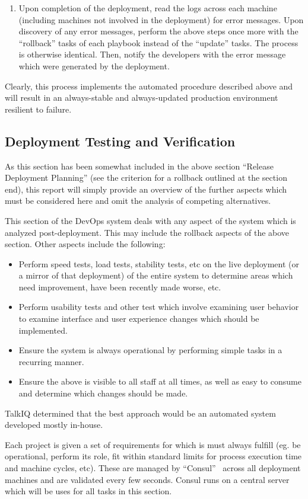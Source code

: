 \documentclass[12pt]{article}
\begin{document}
\begin{enumerate}
\item Upon completion of the deployment, read the logs across each machine (including machines not involved in the deployment) for error messages. Upon discovery of any error messages, perform the above steps once more with the ``rollback'' tasks of each playbook instead of the ``update'' tasks. The process is otherwise identical. Then, notify the developers with the error message which were generated by the deployment.
\end{enumerate}

Clearly, this process implements the automated procedure described above and will result in an always-stable and always-updated production environment resilient to failure.

\subsection{Deployment Testing and Verification}
As this section has been somewhat included in the above section ``Release Deployment Planning'' (see the criterion for a rollback outlined at the section end), this report will simply provide an overview of the further aspects which must be considered here and omit the analysis of competing alternatives.

This section of the DevOps system deals with any aspect of the system which is analyzed post-deployment. This may include the rollback aspects of the above section. Other aspects include the following:
\begin{itemize}
\item Perform speed tests, load tests, stability tests, etc on the live deployment (or a mirror of that deployment) of the entire system to determine areas which need improvement, have been recently made worse, etc.
\item Perform usability tests and other test which involve examining user behavior to examine interface and user experience changes which should be implemented.
\item Ensure the system is always operational by performing simple tasks in a recurring manner.
\item Ensure the above is visible to all staff at all times, as well as easy to consume and determine which changes should be made.
\end{itemize}

TalkIQ determined that the best approach would be an automated system developed mostly in-house.

Each project is given a set of requirements for which is must always fulfill (eg. be operational, perform its role, fit within standard limits for process execution time and machine cycles, etc). These are managed by ``Consul''~\cite{consul} across all deployment machines and are validated every few seconds. Consul runs on a central server which will be uses for all tasks in this section.
\end{document}
